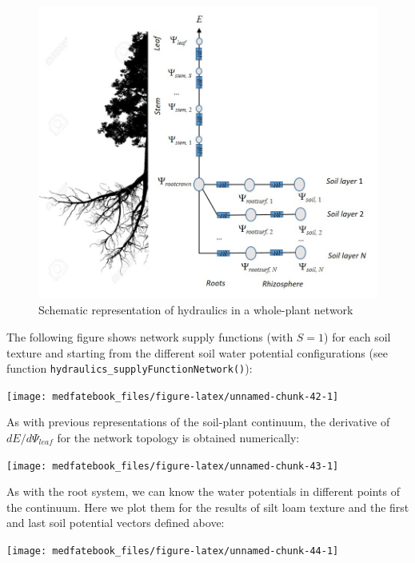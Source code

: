 \documentclass[]{book}
\begin{document}
\begin{figure}

{\centering \includegraphics[width=0.8\linewidth]{hydraulics_nocap} 

}

\caption{Schematic representation of hydraulics in a whole-plant network}\label{fig:unnamed-chunk-41}
\end{figure}

The following figure shows network supply functions (with \(S = 1\)) for each soil texture and starting from the different soil water potential configurations (see function \texttt{hydraulics\_supplyFunctionNetwork()}):

\begin{center}\texttt{[image: medfatebook\_files/figure-latex/unnamed-chunk-42-1]} \end{center}

As with previous representations of the soil-plant continuum, the derivative of \(dE/d\Psi_{leaf}\) for the network topology is obtained numerically:

\begin{center}\texttt{[image: medfatebook\_files/figure-latex/unnamed-chunk-43-1]} \end{center}

As with the root system, we can know the water potentials in different points of the continuum. Here we plot them for the results of silt loam texture and the first and last soil potential vectors defined above:

\begin{center}\texttt{[image: medfatebook\_files/figure-latex/unnamed-chunk-44-1]} \end{center}
\end{document}

